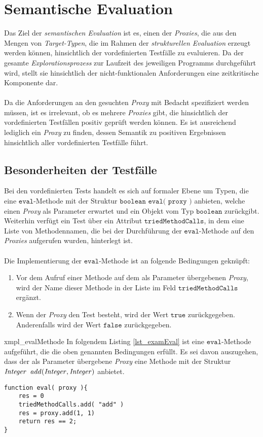 \section{Semantische Evaluation}\label{sec_semEval}
Das Ziel der \emph{semantischen Evaluation} ist es, einen der \emph{Proxies}, die aus den Mengen von \emph{Target-Typen}, die im Rahmen der \emph{strukturellen Evaluation} erzeugt werden können, hinsichtlich der vordefinierten Testfälle zu evaluieren. Da der gesamte \emph{Explorationsprozess} zur Laufzeit des jeweiligen Programms durchgeführt wird, stellt sie hinsichtlich der nicht-funktionalen Anforderungen eine zeitkritische Komponente dar.
\\\\
Da die Anforderungen an den gesuchten \emph{Proxy} mit Bedacht spezifiziert werden müssen, ist es irrelevant, ob es mehrere \emph{Proxies} gibt, die hinsichtlich der vordefinierten Testfällen positiv geprüft werden können. Es ist ausreichend lediglich ein \emph{Proxy} zu finden, dessen Semantik zu positiven Ergebnissen hinsichtlich aller vordefinierten Testfälle führt.
\subsection{Besonderheiten der Testfälle}\label{sec_testanforderungen}
Bei den vordefinierten Tests handelt es sich auf formaler Ebene um Typen, die eine $\texttt{eval}$-Methode mit der Struktur $\texttt{boolean eval( proxy )}$ anbieten, welche einen \emph{Proxy} als Parameter erwartet und ein Objekt vom Typ $\texttt{boolean}$ zurückgibt. Weiterhin verfügt ein Test über ein Attribut $\texttt{triedMethodCalls}$, in dem eine Liste von Methodennamen, die bei der Durchführung der $\texttt{eval}$-Methode auf den \emph{Proxies} aufgerufen wurden, hinterlegt ist.
\\\\
Die Implementierung der $\texttt{eval}$-Methode ist an folgende Bedingungen geknüpft:
\begin{enumerate}
\item Vor dem Aufruf einer Methode auf dem als Parameter übergebenen \emph{Proxy}, wird der Name dieser Methode in der Liste im Feld $\texttt{triedMethodCalls}$ ergänzt.
\item Wenn der \emph{Proxy} den Test besteht, wird der Wert $\texttt{true}$ zurückgegeben. Anderenfalls wird der Wert $\texttt{false}$ zurückgegeben.
\end{enumerate}

\begin{example}{xmpl_evalMethode}
In folgendem Listing \ref{lst_examEval} ist eine $\texttt{eval}$-Methode aufgeführt, die die oben genannten Bedingungen erfüllt. Es sei davon auszugehen, dass der als Parameter übergebene \emph{Proxy} eine Methode mit der Struktur $\mathit{Integer}\texttt{ }\mathit{add(Integer, Integer)}$
anbietet.
\begin{lstlisting}[style = pseudo, label = lst_examEval, caption = Beispielhafte Implementierung einer $\texttt{eval}$-Methode, captionpos = b]
function eval( proxy ){
	res = 0	
	triedMethodCalls.add( "add" )
	res = proxy.add(1, 1)
	return res == 2;
}
\end{lstlisting}
\end{example}

